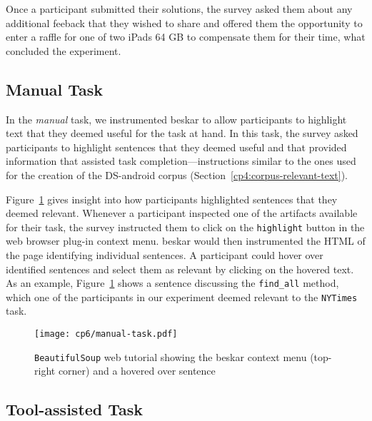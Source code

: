 Once a participant submitted their solutions, the survey
asked them about any additional feeback that they wished to share and 
offered them the opportunity to enter a raffle for one of two iPads 64 GB 
to compensate them for their time, what concluded the experiment.



\subsection{Manual Task}
\label{cp6:procedures-manual}



In the \textit{manual} task, we instrumented \acs{beskar} to allow participants to highlight text that they deemed useful for the task at hand. In this task, 
the survey asked participants to highlight sentences that they deemed useful and that provided information that assisted task completion---instructions similar to the ones used for the creation of the \acs{DS-android} corpus (Section~\ref{cp4:corpus-relevant-text}).



Figure~\ref{fig:artifact-pre-highlight}
gives insight into how participants highlighted sentences that they deemed relevant. 
Whenever a participant inspected one of the artifacts available for their task, 
the survey instructed them to click on the \texttt{highlight} button in the web browser plug-in context menu.  
\acs{beskar} would then instrumented the HTML of the page identifying individual sentences. 
A participant could hover over identified sentences and select them as relevant by clicking on the hovered text.
As an example, Figure~\ref{fig:artifact-pre-highlight} shows a sentence discussing the \texttt{find\_all} method, which 
one of the participants in our experiment deemed 
relevant to the \texttt{NYTimes} task.



\begin{figure}
    \centering
    \texttt{[image: cp6/manual-task.pdf]}
    \caption{\texttt{BeautifulSoup} web tutorial showing the \acs{beskar} context menu (top-right corner) and a hovered over sentence}
    \label{fig:artifact-pre-highlight}
\end{figure}




\subsection{Tool-assisted Task}
\label{cp6:procedures-tool-assisted}


